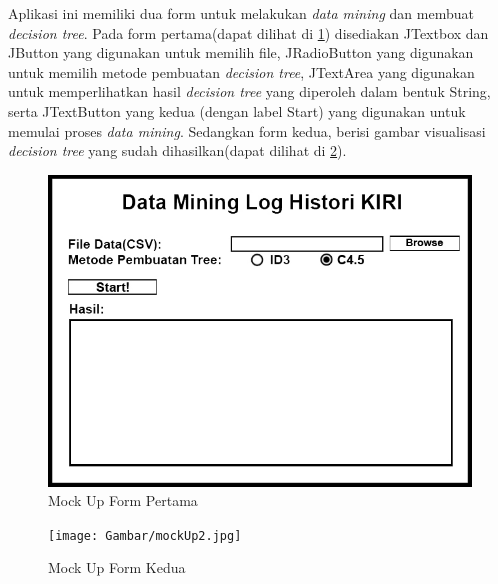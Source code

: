 Aplikasi ini memiliki dua form untuk melakukan \textsl{data mining} dan membuat \textsl{decision tree}. Pada form pertama(dapat dilihat di \ref{fig:MU1}) disediakan JTextbox dan JButton yang digunakan untuk memilih file, JRadioButton yang digunakan untuk memilih metode pembuatan \textsl{decision tree}, JTextArea yang digunakan untuk memperlihatkan hasil \textsl{decision tree} yang diperoleh dalam bentuk String, serta JTextButton yang kedua (dengan label Start) yang digunakan untuk memulai proses \textsl{data mining}. Sedangkan form kedua, berisi gambar visualisasi \textsl{decision tree} yang sudah dihasilkan(dapat dilihat di \ref{fig:MU2}).
\begin{figure}[H]
\centering
\includegraphics[scale=1.2]{Gambar/mockUp1.jpg}
\caption[Mock Up Form Pertama]{Mock Up Form Pertama} 
\label{fig:MU1}
\end{figure}

\begin{figure}[H]
\centering
\texttt{[image: Gambar/mockUp2.jpg]}
\caption[Mock Up Form Kedua]{Mock Up Form Kedua} 
\label{fig:MU2}
\end{figure}
